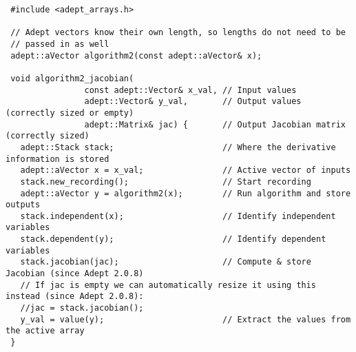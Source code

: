 \documentclass[a4,oneside]{book}
\begin{document}
\begin{lstlisting}
 #include <adept_arrays.h>

 // Adept vectors know their own length, so lengths do not need to be
 // passed in as well
 adept::aVector algorithm2(const adept::aVector& x);

 void algorithm2_jacobian(
                const adept::Vector& x_val, // Input values
                adept::Vector& y_val,       // Output values (correctly sized or empty)
                adept::Matrix& jac) {       // Output Jacobian matrix (correctly sized)
   adept::Stack stack;                      // Where the derivative information is stored
   adept::aVector x = x_val;                // Active vector of inputs
   stack.new_recording();                   // Start recording
   adept::aVector y = algorithm2(x);        // Run algorithm and store outputs
   stack.independent(x);                    // Identify independent variables
   stack.dependent(y);                      // Identify dependent variables
   stack.jacobian(jac);                     // Compute & store Jacobian (since Adept 2.0.8)
   // If jac is empty we can automatically resize it using this instead (since Adept 2.0.8):
   //jac = stack.jacobian();
   y_val = value(y);                        // Extract the values from the active array
 }
\end{lstlisting}
\end{document}
